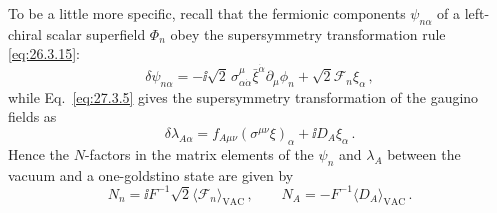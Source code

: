 To be a little more specific, recall that the fermionic components
\(\psi_{n\alpha}\) of a left-chiral scalar superfield \(\Phi_n\) obey the
supersymmetry transformation rule \eqref{eq:26.3.15}:
\begin{equation}
  \delta\psi_{n\alpha}
  =-\ii\sqrt{2}\,
    \sigma^\mu_{\alpha\dot\alpha}\bar\xi^{\dot\alpha}
      \partial_\mu\phi_n
  +\sqrt{2}\mathcal{F}_n\xi_\alpha\,,
  \tag{29.2.30}\label{eq:29.2.30}
\end{equation}
while Eq.~\eqref{eq:27.3.5} gives the supersymmetry transformation of the
gaugino fields as
\begin{equation}
  \delta\lambda_{A\alpha}
  =f_{A\mu\nu}(\sigma^{\mu\nu}\xi)_\alpha
    +\ii D_A\xi_\alpha\,.
  \tag{29.2.31}\label{eq:29.2.31}
\end{equation}
Hence the \(N\)-factors in the matrix elements of the \(\psi_n\) and
\(\lambda_A\) between the vacuum and a one-goldstino state are given by
\begin{equation}
  N_n
  =\ii F^{-1}\sqrt{2}
    \langle\mathcal{F}_n\rangle_{\mathrm{VAC}}\,,
  \qquad
  N_A
  =-F^{-1}\langle D_A\rangle_{\mathrm{VAC}}\,.
  \tag{29.2.32}\label{eq:29.2.32}
\end{equation}

